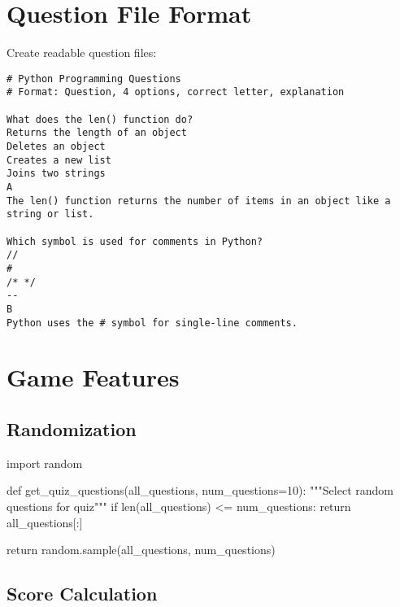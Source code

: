 \documentclass[
  letterpaper,
  DIV=11,
  numbers=noendperiod,
  oneside]{scrreprt}
\newenvironment{Shaded}{}{}
\newcommand{\BuiltInTok}[1]{\textcolor[rgb]{0.84,0.23,0.29}{#1}}
\newcommand{\CommentTok}[1]{\textcolor[rgb]{0.42,0.45,0.49}{#1}}
\newcommand{\ControlFlowTok}[1]{\textcolor[rgb]{0.84,0.23,0.29}{#1}}
\newcommand{\DecValTok}[1]{\textcolor[rgb]{0.00,0.36,0.77}{#1}}
\newcommand{\ImportTok}[1]{\textcolor[rgb]{0.01,0.18,0.38}{#1}}
\newcommand{\KeywordTok}[1]{\textcolor[rgb]{0.84,0.23,0.29}{#1}}
\newcommand{\NormalTok}[1]{\textcolor[rgb]{0.14,0.16,0.18}{#1}}
\newcommand{\OperatorTok}[1]{\textcolor[rgb]{0.14,0.16,0.18}{#1}}
\begin{document}
\section{Question File Format}\label{question-file-format}

Create readable question files:

\begin{verbatim}
# Python Programming Questions
# Format: Question, 4 options, correct letter, explanation

What does the len() function do?
Returns the length of an object
Deletes an object
Creates a new list
Joins two strings
A
The len() function returns the number of items in an object like a string or list.

Which symbol is used for comments in Python?
//
#
/* */
--
B
Python uses the # symbol for single-line comments.
\end{verbatim}

\section{Game Features}\label{game-features}

\subsection{Randomization}\label{randomization}

\begin{Shaded}
\begin{Highlighting}[]
\ImportTok{import}\NormalTok{ random}

\KeywordTok{def}\NormalTok{ get\_quiz\_questions(all\_questions, num\_questions}\OperatorTok{=}\DecValTok{10}\NormalTok{):}
    \CommentTok{"""Select random questions for quiz"""}
    \ControlFlowTok{if} \BuiltInTok{len}\NormalTok{(all\_questions) }\OperatorTok{\textless{}=}\NormalTok{ num\_questions:}
        \ControlFlowTok{return}\NormalTok{ all\_questions[:]}
    
    \ControlFlowTok{return}\NormalTok{ random.sample(all\_questions, num\_questions)}
\end{Highlighting}
\end{Shaded}

\subsection{Score Calculation}\label{score-calculation}
\end{document}
